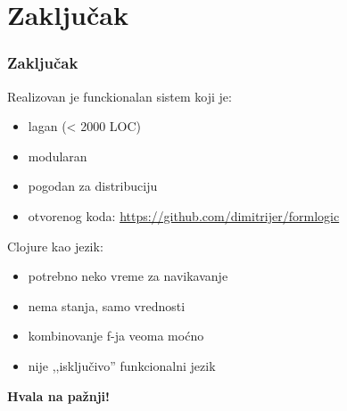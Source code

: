 \documentclass[compress,12pt,hyperref=unicode]{beamer}
\begin{document}
\section{Zaključak}
\begin{frame}
\frametitle{Zaključak}
Realizovan je funckionalan sistem koji je:
\begin{itemize}
\item lagan (< 2000 LOC)
\item modularan
\item pogodan za distribuciju
\item otvorenog koda: \url{https://github.com/dimitrijer/formlogic}
\end{itemize}
Clojure kao jezik:
\begin{itemize}
\item potrebno neko vreme za navikavanje
\item nema stanja, samo vrednosti
\item kombinovanje f-ja veoma moćno
\item nije ,,isključivo'' funkcionalni jezik
\end{itemize}
\end{frame}

\begin{frame}
\centering
\Large \bfseries Hvala na pažnji!
\end{frame}
\end{document}
